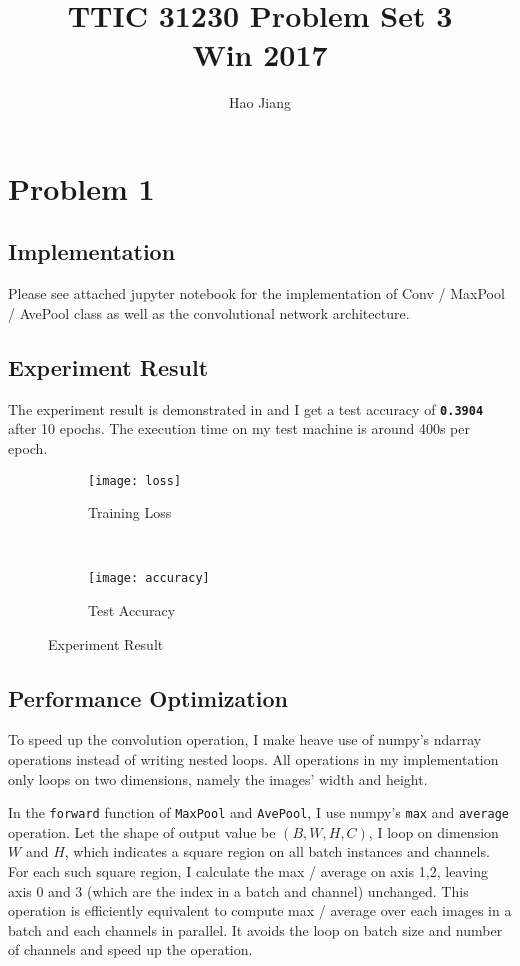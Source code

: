 \documentclass{article}
\title{TTIC 31230 Problem Set 3 \\ Win 2017}
\author{Hao Jiang}
\begin{document}
\maketitle

\section*{Problem 1}
\subsection*{Implementation}
Please see attached jupyter notebook for the implementation of Conv / MaxPool /
AvePool class as well as the convolutional network architecture.
\subsection*{Experiment Result}
The experiment result is demonstrated in  and I get a test
accuracy of \textbf{\texttt{0.3904}} after 10 epochs. The execution time on my
test machine is around 400s per epoch.
\begin{figure*}
\begin{subfigure}{0.5\textwidth}
\texttt{[image: loss]}
\caption{Training Loss}
\end{subfigure}
~
\begin{subfigure}{0.5\textwidth}
\texttt{[image: accuracy]}
\caption{Test Accuracy}
\end{subfigure}
\caption{Experiment Result}
\label{fig:result}
\end{figure*}
\subsection*{Performance Optimization}
To speed up the convolution operation, I make heave use of numpy's
ndarray operations instead of writing nested loops. All operations in my
implementation only loops on two dimensions, namely the images' width and
height.

In the \texttt{forward} function of \texttt{MaxPool} and \texttt{AvePool}, I use
numpy's \texttt{max} and \texttt{average} operation. Let the shape of output
value be $(B,W,H,C)$, I loop on dimension $W$ and $H$, which indicates a square
region on all batch instances and channels. For each such square region, I
calculate the max / average on axis 1,2, leaving axis 0 and 3 (which are the
index in a batch and channel) unchanged. This operation is efficiently
equivalent to compute max / average over each images in a batch and each
channels in parallel. It avoids the loop on batch size and number of channels
and speed up the operation.
\end{document}
